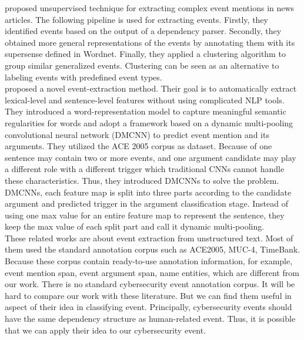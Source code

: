 \indent \cite{rusu2014unsupervised} proposed unsupervised technique for extracting complex event mentions in news articles. The following pipeline is used for extracting events. Firstly, they identified events based on the output of a dependency parser. Secondly, they obtained more general representations of the events by annotating them with its supersense defined in Wordnet. Finally, they applied a clustering algorithm to group similar generalized events. Clustering can be seen as an alternative to labeling events with predefined event types. \\
\indent \cite{chen2015event} proposed a novel event-extraction
method. Their goal is to automatically extract lexical-level and sentence-level features without using complicated NLP tools. They introduced a word-representation model to capture meaningful semantic regularities for words and adopt a framework based on a dynamic multi-pooling convolutional neural network (DMCNN) to predict event mention and its arguments. They utilized the ACE 2005 corpus as dataset. Because of one sentence may contain two or more events, and one argument candidate may play a different role with a different trigger which traditional CNNs cannot handle these characteristics. Thus, they introduced DMCNNs to solve the problem. DMCNNs, each feature map is split into three parts according to the candidate argument and predicted trigger in the argument classification stage. Instead of using one max value for an entire feature map to represent the sentence, they keep the max value of each split part and call it dynamic multi-pooling.\\
\indent These related works are about event extraction from unstructured text. Most of them used the standard annotation corpus such as ACE2005, MUC-4, TimeBank. Because these corpus contain ready-to-use annotation information, for example, event mention span, event argument span, name entities, which are different from our work. There is no standard cybersecurity event annotation corpus. It will be hard to compare our work with these literature. But we can find them useful in aspect of their idea in classifying event. Principally, cybersecurity events should have the same dependency structure as human-related event. Thus, it is possible that we can apply their idea to our cybersecurity event. 